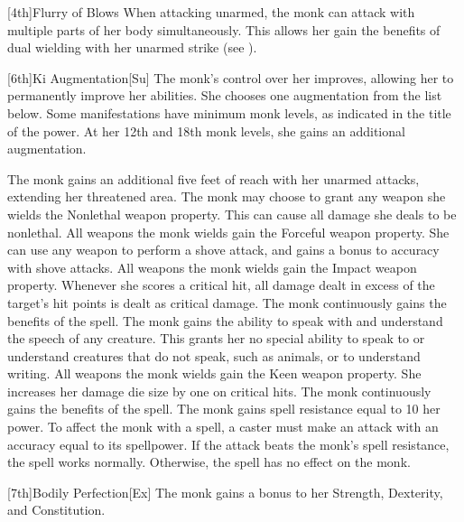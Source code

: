 [4th]{Flurry of Blows}
When attacking unarmed, the monk can attack with multiple parts of her body simultaneously.
This allows her gain the benefits of dual wielding with her unarmed strike (see ).


[6th]{Ki Augmentation}[Su]
The monk's control over her \ki improves, allowing her to permanently improve her abilities.
She chooses one \ki augmentation from the list below.
Some \ki manifestations have minimum monk levels, as indicated in the title of the power.
At her 12th and 18th monk levels, she gains an additional \ki augmentation.

The monk gains an additional five feet of reach with her unarmed attacks, extending her threatened area.
The monk may choose to grant any weapon she wields the Nonlethal weapon property.
This can cause all damage she deals to be nonlethal.
All weapons the monk wields gain the Forceful weapon property.
She can use any weapon to perform a shove attack, and gains a  bonus to accuracy with shove attacks.
All weapons the monk wields gain the Impact weapon property.
Whenever she scores a critical hit, all damage dealt in excess of the target's hit points is dealt as critical damage.
The monk continuously gains the benefits of the  spell.
The monk gains the ability to speak with and understand the speech of any creature.
This grants her no special ability to speak to or understand creatures that do not speak, such as animals, or to understand writing.
All weapons the monk wields gain the Keen weapon property.
She increases her damage die size by one on critical hits.
The monk continuously gains the benefits of the  spell.
The monk gains spell resistance equal to 10 \add her \ki power.
To affect the monk with a spell, a caster must make an attack with an accuracy equal to its spellpower.
If the attack beats the monk's spell resistance, the spell works normally.
Otherwise, the spell has no effect on the monk.

[7th]{Bodily Perfection}[Ex]
The monk gains a  bonus to her Strength, Dexterity, and Constitution.


